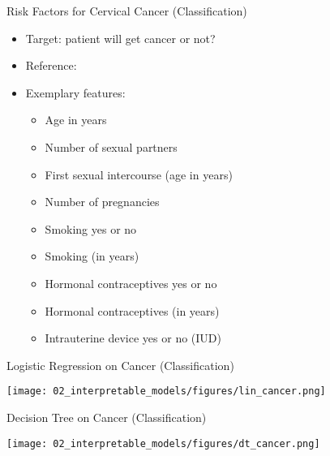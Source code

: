 \documentclass[aspectratio=169]{../latex_main/tntbeamer}  %
\begin{document}
    \begin{frame}{Risk Factors for Cervical Cancer (Classification)}
        
        \begin{itemize}
            \item Target: patient will get cancer or not?
            \item Reference: 
            \item Exemplary features:
            \begin{itemize}
                \item Age in years
                \item Number of sexual partners
                \item First sexual intercourse (age in years)
                \item Number of pregnancies
                \item Smoking yes or no
                \item Smoking (in years)
                \item Hormonal contraceptives yes or no
                \item Hormonal contraceptives (in years)
                \item Intrauterine device yes or no (IUD)
            \end{itemize}
        \end{itemize}
        
    \end{frame}
	
	\begin{frame}{Logistic Regression on  Cancer (Classification)}
        
        \centering
        \texttt{[image: 02\_interpretable\_models/figures/lin\_cancer.png]}     
        
    \end{frame}
	
	\begin{frame}{Decision Tree on  Cancer (Classification)}
        
        \centering
        \texttt{[image: 02\_interpretable\_models/figures/dt\_cancer.png]}     
    \end{frame}
	
\end{document}
